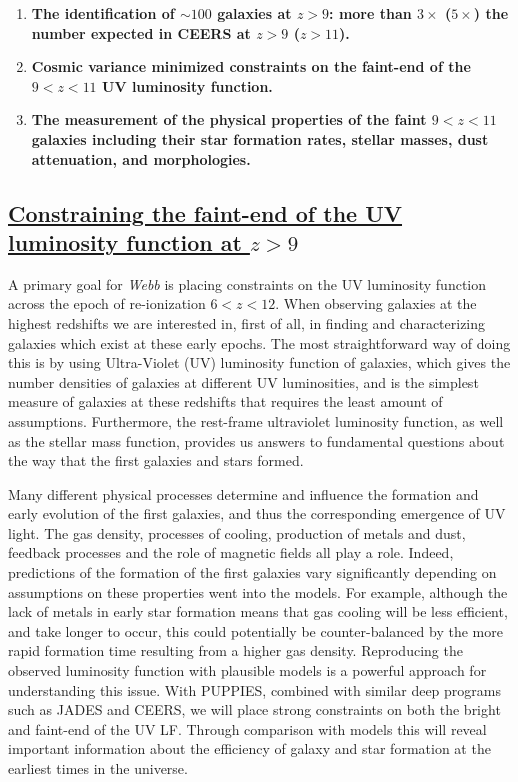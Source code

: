 \documentclass[12pt]{article}
\begin{document}
\begin{enumerate}
\item \textbf{The identification of $\sim 100$ galaxies at $z>9$: more than $3\times$ ($5\times$) the number expected in CEERS at $z>9$ ($z>11$).}
\item \textbf{Cosmic variance minimized constraints on the faint-end of the $9<z<11$ UV luminosity function.} 
\item \textbf{The measurement of the physical properties of the faint $9<z<11$ galaxies including their star formation rates, stellar masses, dust attenuation, and morphologies.}
\end{enumerate}

\subsection{\bf \underline{Constraining the faint-end of the UV luminosity function at $z > 9$}}\label{sec:UVLF}

A primary goal for \emph{Webb} is placing constraints on the UV luminosity function across the epoch of re-ionization $6<z<12$. When observing galaxies at the highest redshifts we are interested in, first of all, in finding and characterizing galaxies which exist at these early epochs.  The most straightforward way of doing this is by using Ultra-Violet (UV) luminosity function of galaxies, which gives the number densities of galaxies at different UV luminosities, and is the simplest measure of galaxies at these redshifts that requires the least amount of assumptions.  Furthermore, the rest-frame ultraviolet luminosity function, as well as the stellar mass function, provides us answers to fundamental questions about the way that the first galaxies and stars formed.

Many different physical processes determine and influence the formation and early evolution of the first galaxies, and thus the corresponding emergence of UV light. The gas density, processes of cooling, production of metals and dust, feedback processes and the role of magnetic fields all play a role. Indeed, predictions of the formation of the first galaxies vary significantly depending on assumptions on these properties went into the models. For example, although the lack of metals in early star formation means that gas cooling will be less efficient, and take longer to occur, this could potentially be counter-balanced by the more rapid formation time resulting from a higher gas density. Reproducing the observed luminosity function with plausible models is a powerful approach for understanding this issue. With PUPPIES, combined with similar deep programs such as JADES and CEERS, we will place strong constraints on both the bright and faint-end of the UV LF. Through comparison with models this will reveal important information about the efficiency of galaxy and star formation at the earliest times in the universe.
 
\end{document}
